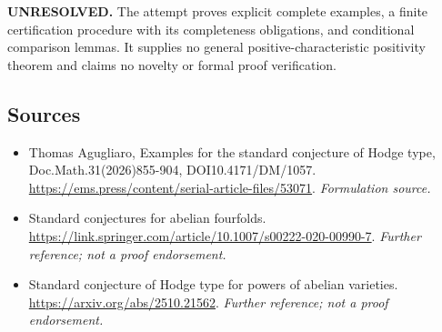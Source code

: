 \documentclass[11pt]{article}
\begin{document}
\textbf{UNRESOLVED.} The attempt proves explicit complete examples,
a finite certification procedure with its completeness obligations,
and conditional comparison lemmas. It supplies no general
positive-characteristic positivity theorem and claims no novelty or
formal proof verification.

\subsection{Sources}
\begin{itemize}
\item[S1]Thomas Agugliaro, Examples for the standard conjecture of Hodge type, Doc.Math.31(2026)855-904, DOI10.4171/DM/1057.
\url{https://ems.press/content/serial-article-files/53071}.
\textit{Formulation source.}
\item[S2]Standard conjectures for abelian fourfolds.
\url{https://link.springer.com/article/10.1007/s00222-020-00990-7}.
\textit{Further reference; not a proof endorsement.}
\item[S3]Standard conjecture of Hodge type for powers of abelian varieties.
\url{https://arxiv.org/abs/2510.21562}.
\textit{Further reference; not a proof endorsement.}
\end{itemize}
\end{document}
